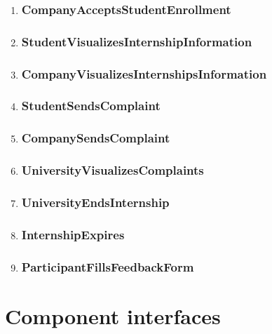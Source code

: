 \begin{enumerate}[label=\textbf{RV\arabic* -}]
\item \subsubsection{CompanyAcceptsStudentEnrollment}
\item \subsubsection{StudentVisualizesInternshipInformation}
\item \subsubsection{CompanyVisualizesInternshipsInformation}
\item \subsubsection{StudentSendsComplaint}
\item \subsubsection{CompanySendsComplaint}
\item \subsubsection{UniversityVisualizesComplaints}
\item \subsubsection{UniversityEndsInternship}
\item \subsubsection{InternshipExpires}
\item \subsubsection{ParticipantFillsFeedbackForm}

\end{enumerate}

\section{Component interfaces}

